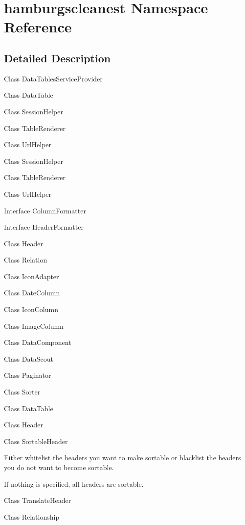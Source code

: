\hypertarget{namespacehamburgscleanest}{}\section{hamburgscleanest Namespace Reference}
\label{namespacehamburgscleanest}


\subsection{Detailed Description}
Class Data\+Tables\+Service\+Provider 

Class Data\+Table 

Class Session\+Helper 

Class Table\+Renderer 

Class Url\+Helper 

Class Session\+Helper 

Class Table\+Renderer 

Class Url\+Helper 

Interface Column\+Formatter 

Interface Header\+Formatter 

Class Header 

Class Relation 

Class Icon\+Adapter 

Class Date\+Column 

Class Icon\+Column 

Class Image\+Column 

Class Data\+Component 

Class Data\+Scout 

Class Paginator 

Class Sorter 

Class Data\+Table 

Class Header 

Class Sortable\+Header

Either whitelist the headers you want to make sortable or blacklist the headers you do not want to become sortable.

If nothing is specified, all headers are sortable.

Class Translate\+Header

Class Relationship  